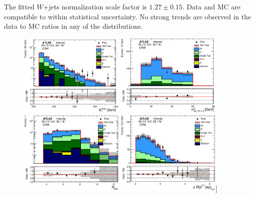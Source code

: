 \indent  The fitted $W$+jets normalization scale factor is $1.27 \pm 0.15$.  Data and MC are compatible to within statistical uncertainty.  No strong trends are observed in the data to MC ratios in any of the distributions. \\

\begin{figure}[!h]
  \centering
  \includegraphics[width=0.45\textwidth]{figures/wJets/postfit/Met_CRW_log.eps}
    \includegraphics[width=0.45\textwidth]{figures/wJets/postfit/AntiKt12M_0__CRW.eps}
  \includegraphics[width=0.45\textwidth]{figures/wJets/postfit/NJets_CRW_log.eps}
  \includegraphics[width=0.45\textwidth]{figures/wJets/postfit/MinDRBLep_CRW.eps}]

\end{figure}
